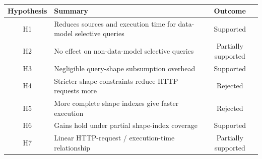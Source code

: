 \begin{table}[htbp]
	\centering
	\ifreview\color{revone}\fi
	\begin{tabular}{|c|l|c|}
		\hline
		\textbf{Hypothesis} & \textbf{Summary}                                                    & \textbf{Outcome}    \\
		\hline
		H1                  & Reduces sources and execution time for data-model selective queries & Supported           \\
		H2                  & No effect on non-data-model selective queries                       & Partially supported \\
		H3                  & Negligible query-shape subsumption overhead                         & Supported           \\
		H4                  & Stricter shape constraints reduce \ac{HTTP} requests more           & Rejected            \\
		H5                  & More complete shape indexes give faster execution                   & Rejected            \\
		H6                  & Gains hold under partial shape-index coverage                       & Supported           \\
		H7                  & Linear \ac{HTTP}-request / execution-time relationship              & Partially supported \\
		\hline
	\end{tabular}
	\caption{}
	\label{tab:hypothesisSummary}
\end{table}
